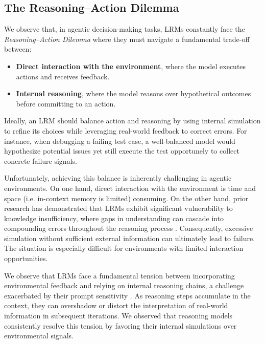 \subsection{The Reasoning–Action Dilemma}
We observe that, in agentic decision-making tasks, LRMs constantly face the \emph{Reasoning–Action Dilemma} where they must navigate a fundamental trade-off between:
\begin{itemize}
    \item \textbf{Direct interaction with the environment}, where the model executes actions and receives feedback.
    \item \textbf{Internal reasoning}, where the model reasons over hypothetical outcomes before committing to an action.
\end{itemize}

Ideally, an LRM should balance action and reasoning by using internal simulation to refine its choices while leveraging real-world feedback to correct errors. For instance, when debugging a failing test case, a well-balanced model would hypothesize potential issues yet still execute the test opportunely to collect concrete failure signals. 

Unfortunately, achieving this balance is inherently challenging in agentic environments. On one hand, direct interaction with the environment is time and space (i.e. in-context memory is limited) consuming. On the other hand, prior research has demonstrated that LRMs exhibit significant vulnerability to knowledge insufficiency, where gaps in understanding can cascade into compounding errors throughout the reasoning process \cite{li2025searcho1agenticsearchenhancedlarge, zhong2024evaluationopenaio1opportunities, LingFLHLMS23, chia2024reasoningpathsoptimizationlearning}. Consequently, excessive simulation without sufficient external information can ultimately lead to failure. The situation is especially difficult for environments with limited interaction opportunities.

We observe that LRMs face a fundamental tension between incorporating environmental feedback and relying on internal reasoning chains, a challenge exacerbated by their prompt sensitivity \cite{openai_learning_to_reason_2024, deepseekai2025deepseekr1incentivizingreasoningcapability}. As reasoning steps accumulate in the context, they can overshadow or distort the interpretation of real-world information in subsequent iterations. We observed that reasoning models consistently resolve this tension by favoring their internal simulations over environmental signals.


